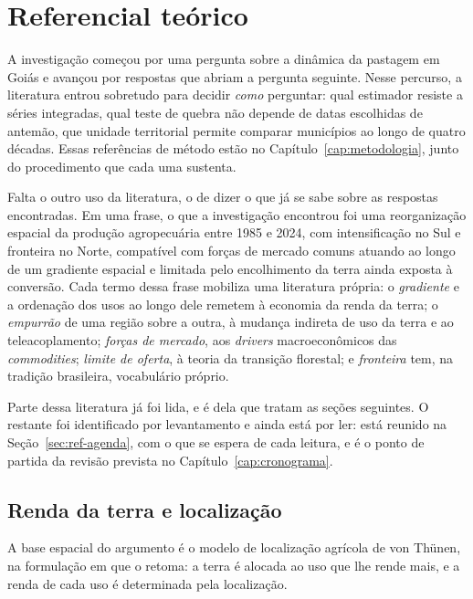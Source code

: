 \chapter{Referencial teórico}
\label{cap:referencial}

A investigação começou por uma pergunta sobre a dinâmica da pastagem em Goiás
e avançou por respostas que abriam a pergunta seguinte. Nesse percurso, a
literatura entrou sobretudo para decidir \emph{como} perguntar: qual
estimador resiste a séries integradas, qual teste de quebra não depende de
datas escolhidas de antemão, que unidade territorial permite comparar
municípios ao longo de quatro décadas. Essas referências de método estão no
Capítulo~\ref{cap:metodologia}, junto do procedimento que cada uma sustenta.

Falta o outro uso da literatura, o de dizer o que já se sabe sobre as
respostas encontradas. Em uma frase, o que a investigação encontrou foi uma
reorganização espacial da produção agropecuária entre 1985 e 2024, com
intensificação no Sul e fronteira no Norte, compatível com forças de mercado
comuns atuando ao longo de um gradiente espacial e limitada pelo encolhimento da
terra ainda exposta à conversão. Cada termo dessa frase mobiliza uma
literatura própria: o \emph{gradiente} e a ordenação dos usos ao longo dele
remetem à economia da renda da terra; o \emph{empurrão} de uma região sobre a outra, à mudança indireta de
uso da terra e ao teleacoplamento; \emph{forças de mercado}, aos
\emph{drivers} macroeconômicos das \emph{commodities}; \emph{limite de
oferta}, à teoria da transição florestal; e \emph{fronteira} tem, na tradição
brasileira, vocabulário próprio.

Parte dessa literatura já foi lida, e é dela que tratam as seções seguintes. O
restante foi identificado por levantamento e ainda está por ler: está reunido
na Seção~\ref{sec:ref-agenda}, com o que se espera de cada leitura, e é o
ponto de partida da revisão prevista no Capítulo~\ref{cap:cronograma}.

\section{Renda da terra e localização}
\label{sec:ref-renda}

A base espacial do argumento é o modelo de localização agrícola de von
Thünen, na formulação em que  o retoma: a terra é
alocada ao uso que lhe rende mais, e a renda de cada uso é determinada pela
localização.

